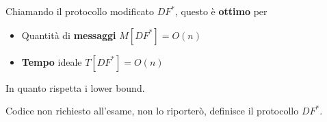 Chiamando il protocollo modificato $DF^\ast$, questo è \textbf{ottimo} per
\begin{itemize}
	\item Quantità di \textbf{messaggi} $M[DF^\ast] = O(n)$
	\item \textbf{Tempo} ideale $T[DF^\ast] = O(n)$
\end{itemize}

In quanto rispetta i lower bound.\\

\vfill

Codice non richiesto all'esame, non lo riporterò, definisce il protocollo $DF^\ast$.\\